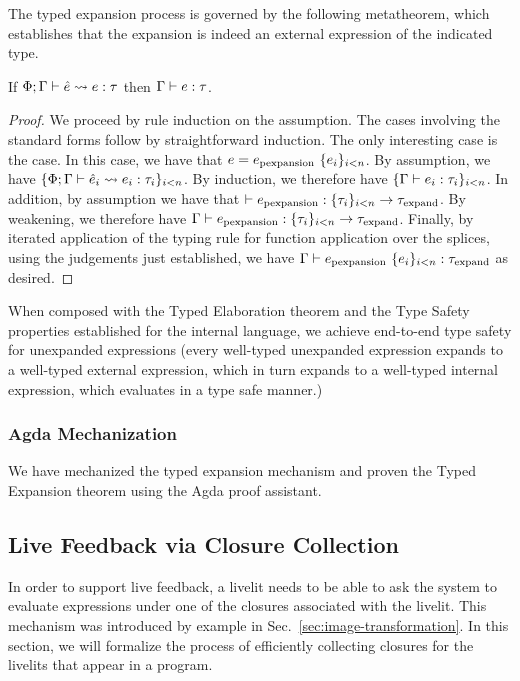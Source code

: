 The typed expansion process is governed by the following metatheorem, which establishes that the expansion 
is indeed an external expression of the indicated type.

\begin{theorem}
    If $\Phi; \Gamma \vdash \hat e \leadsto e : \tau$ then $\Gamma \vdash e : \tau$.
\end{theorem}
\begin{proof}
    We proceed by rule induction on the assumption. 
    The cases involving the standard forms follow by straightforward induction.
    The only interesting case is the  case.
    In this case, we have that $e = e_\text{pexpansion}~\{e_i\}_{i < n}$. 
    By assumption, we have $\{ \Phi; \Gamma \vdash \hat e_i \leadsto e_i : \tau_i \}_{i < n}$.
    By induction, we therefore have $\{ \Gamma \vdash e_i : \tau_i \}_{i < n}$.
    In addition, by assumption we have that $\vdash e_\text{pexpansion} : \{\tau_i\}_{i < n} \rightarrow \tau_\text{expand}$.
    By weakening, we therefore have $\Gamma \vdash e_\text{pexpansion} : \{\tau_i\}_{i < n} \rightarrow \tau_\text{expand}$.
    Finally, by iterated application of the typing rule for function application over the splices, 
    using the judgements just established, 
    we have $\Gamma \vdash e_\text{pexpansion}~\{e_i\}_{i < n} : \tau_\text{expand}$ as desired.
\end{proof}

When composed with the Typed Elaboration theorem and the Type Safety properties established for the internal 
language, we achieve end-to-end type safety for unexpanded expressions (every well-typed unexpanded 
expression expands to a well-typed external expression, which in turn expands to a well-typed internal 
expression, which evaluates in a type safe manner.)

\subsubsection{Agda Mechanization}
We have mechanized the typed expansion mechanism and proven the Typed Expansion theorem 
using the Agda proof assistant.

\subsection{Live Feedback via Closure Collection}
In order to support live feedback, a livelit needs to be able to ask the system
to evaluate expressions under one of the closures associated with the livelit.
This mechanism was introduced by example in Sec.~\ref{sec:image-transformation}.
In this section, we will formalize the process of efficiently collecting closures 
for the livelits that appear in a program. 

